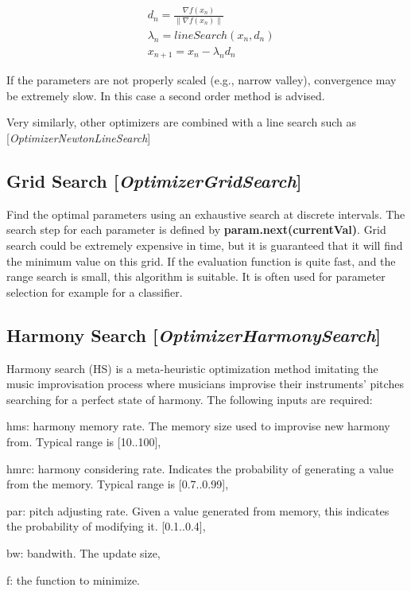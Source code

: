 \documentclass[11pt]{article}
\newcommand{\nllref}[1]{[\small{\textit{#1}}]}
\begin{document}
\begin{align}
& d_n = \frac{\nabla{f}(x_n)}{\lVert \nabla{f}(x_n) \lVert} \nonumber\\
& \lambda_n = lineSearch(x_n, d_n) \nonumber\\
& x_{n+1} = x_n - \lambda _n d_n
\end{align}

If the parameters are not properly scaled (e.g., narrow valley), convergence may be extremely slow. In this case a second order method is advised.

Very similarly, other optimizers are combined with a line search such as
\nllref{OptimizerNewtonLineSearch}

\subsection{Grid Search \nllref{OptimizerGridSearch}}
Find the optimal parameters using an exhaustive search at discrete intervals. The search step for each parameter is defined
by \textbf{param.next(currentVal)}. Grid search could be extremely expensive in time, but it is guaranteed that it will find the minimum
value on this grid. If the evaluation function is quite fast, and the range search is small, this algorithm is suitable. It is often used for parameter selection for example for a classifier.

\subsection{Harmony Search \nllref{OptimizerHarmonySearch}}
Harmony search (HS) is a meta-heuristic optimization method imitating the music improvisation process where
musicians improvise their instruments' pitches searching for a perfect state of harmony. The following inputs are required:
\begin{compactitem}
\item hms: harmony memory rate. The memory size used to improvise new harmony from. Typical range is [10..100],
\item hmrc: harmony considering rate. Indicates the probability of generating a value from the memory. Typical range is [0.7..0.99],
\item par: pitch adjusting rate. Given a value generated from memory, this indicates the probability of modifying it. [0.1..0.4],
\item bw: bandwith. The update size,
\item f: the function to minimize.
\end{compactitem}
\end{document}
